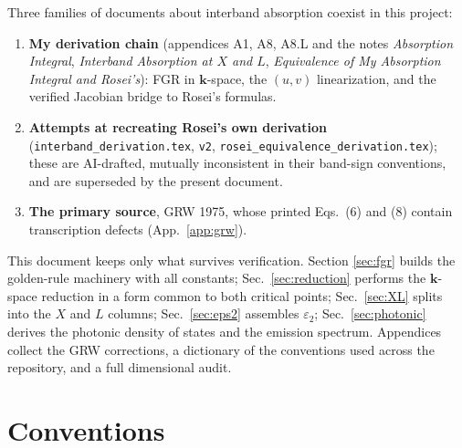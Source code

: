 \documentclass[11pt,a4paper]{article}
\numberwithin{equation}{section}
\newcommand{\eps}{\varepsilon}
\begin{document}
Three families of documents about interband absorption coexist in this
project:
\begin{enumerate}
\item \textbf{My derivation chain} (appendices A1, A8, A8.L and the
      notes \emph{Absorption Integral}, \emph{Interband Absorption at
      $X$ and $L$}, \emph{Equivalence of My Absorption Integral and
      Rosei's}): FGR in $\mathbf{k}$-space, the $(u,v)$ linearization,
      and the verified Jacobian bridge to Rosei's formulas.
\item \textbf{Attempts at recreating Rosei's own derivation}
      (\texttt{interband\_derivation.tex}, \texttt{v2},
      \texttt{rosei\_equivalence\_derivation.tex}); these are
      AI-drafted, mutually inconsistent in their band-sign
      conventions, and are superseded by the present document.
\item \textbf{The primary source}, GRW 1975, whose printed Eqs.~(6)
      and (8) contain transcription defects (App.~\ref{app:grw}).
\end{enumerate}
This document keeps only what survives verification.  Section
\ref{sec:fgr} builds the golden-rule machinery with all constants;
Sec.~\ref{sec:reduction} performs the $\mathbf{k}$-space reduction in a
form common to both critical points; Sec.~\ref{sec:XL} splits into the
$X$ and $L$ columns; Sec.~\ref{sec:eps2} assembles $\eps_2$;
Sec.~\ref{sec:photonic} derives the photonic density of states and the
emission spectrum.  Appendices collect the GRW corrections, a
dictionary of the conventions used across the repository, and a full
dimensional audit.

\section{Conventions}\label{sec:conv}
\end{document}

